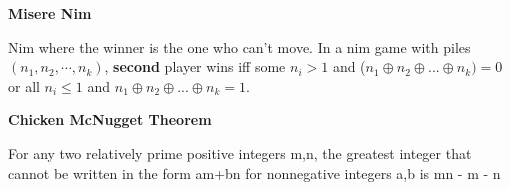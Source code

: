 \bigbreak
\textbf{Misere Nim}

Nim where the winner is the one who can't move. In a nim game with piles $(n_1, n_2, \cdots, n_k)$, \textbf{second} player wins iff some $n_i > 1$ and ($n_1 \oplus n_2 \oplus ... \oplus n_k) = 0$ or all $n_i \leq 1$ and $n_1 \oplus n_2 \oplus ... \oplus n_k = 1$.

\bigbreak
\textbf{Chicken McNugget Theorem}

For any two relatively prime positive integers m,n, the greatest integer that cannot be written in the form am+bn for nonnegative integers a,b is mn - m - n